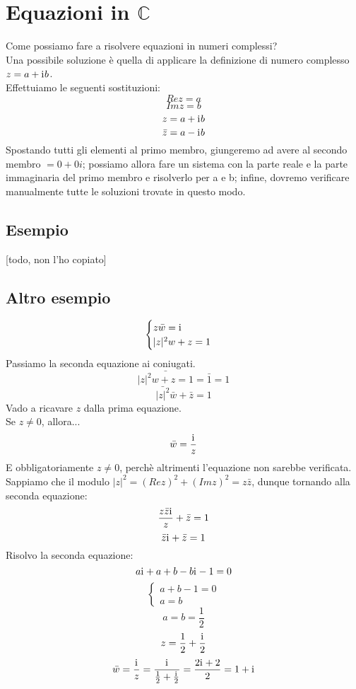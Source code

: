 \documentclass{article}
\newcommand{\iu}{\mathrm{i}\mkern1mu}
\begin{document}
\section{Equazioni in \(\mathbb{C}\)}
Come possiamo fare a risolvere equazioni in numeri complessi?\\
Una possibile soluzione è quella di applicare la definizione di numero complesso \(z = a + \iu b\).\\
Effettuiamo le seguenti sostituzioni:
\[Re z = a\]
\[Im z = b\]
\[z = a + \iu b\]
\[\bar{z} = a - \iu b\]
Spostando tutti gli elementi al primo membro, giungeremo ad avere al secondo membro \(= 0 + 0i\); possiamo allora fare un sistema con la parte reale e la parte immaginaria del primo membro e risolverlo per a e b; infine, dovremo verificare manualmente tutte le soluzioni trovate in questo modo.

\subsection{Esempio}
[todo, non l'ho copiato]

\subsection{Altro esempio}
\[\begin{cases}
    z \bar{w} = \iu\\
    |z|^2 w + z = 1
\end{cases}\]
Passiamo la seconda equazione ai coniugati.
\[\bar{|z|^2 w + z = 1} = \bar{1} = 1\]
\[\bar{|z|^2} \bar{w} + \bar{z} = 1\]
Vado a ricavare \(z\) dalla prima equazione.\\
Se \(z \neq 0\), allora...
\[\bar{w} = \frac{\iu}{z}\]
E obbligatoriamente \(z \neq 0\), perchè altrimenti l'equazione non sarebbe verificata.\\
Sappiamo che il modulo \(|z|^2 = (Re z)^2 + (Im z)^2 = z \bar{z}\), dunque tornando alla seconda equazione:
\[\frac{z \bar{z} \iu}{z} + \bar{z} = 1\]
\[\bar{z} \iu + \bar{z} = 1\]
Risolvo la seconda equazione:
\[a\iu + a + b - b\iu - 1 = 0\]
\[\begin{cases}
    a + b - 1 = 0\\
    a = b
\end{cases}\]
\[a = b = \frac{1}{2}\]
\[z = \frac{1}{2} + \frac{\iu}{2}\]
\[\bar{w} = \frac{\iu}{z} = \frac{\iu}{\frac{1}{2} + \frac{\iu}{2}} = \frac{2 \iu + 2}{2} = 1 + \iu\]
\end{document}
